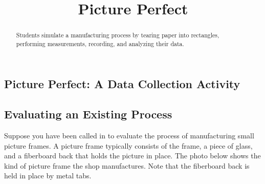 \documentclass{ximera}
\author{}
\title{Picture Perfect} \license{CC BY-NC-SA 4.0}
\begin{document}
\begin{abstract}
Students simulate a manufacturing process by tearing paper into rectangles, performing measurements, recording, and analyzing their data.
\end{abstract}
\maketitle

\begin{onlineOnly}
\section*{Picture Perfect: A Data Collection Activity}
\end{onlineOnly}

\subsection*{Evaluating an Existing Process}

Suppose you have been called in to evaluate the process of manufacturing small picture frames.  A picture frame typically consists of the frame, a piece of glass, and a fiberboard back that holds the picture in place. The photo below shows the kind of picture frame the shop manufactures. Note that the fiberboard back is held in place by metal tabs.  

\begin{center}
       \end{center}
\end{document}
